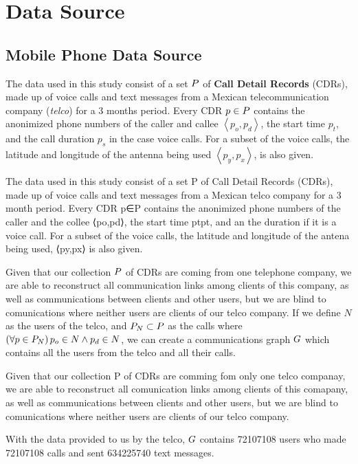 \section{Data Source}

\subsection{Mobile Phone Data Source}

The data used in this study consist of a set \( \mathlarger{P} \) of \textbf{Call Detail Records} (CDRs), made up of voice calls and text messages from a Mexican telecommunication company (\textit{telco}) for a 3 months period.
Every CDR \( p \in \mathlarger{P} \)  contains the anonimized phone numbers of the caller and callee \( \left< p_o, p_d \right> \), the start time \( p_t \), and the call duration \( p_s \) in the case voice calls. 
For a subset of the voice calls, the latitude and longitude of the antenna being used \( \left< p_y, p_x \right> \), is also given.

The data used in this study consist of a set P of Call Detail Records (CDRs), made up of voice calls and text messages from a Mexican telco company for a 3 month period. Every CDR p∈P contains the anonimized phone numbers of the caller and the collee ⟨po,pd⟩, the start time ptpt, and an the duration if it is a voice call. For a subset of the voice calls, the latitude and longitude of the antena being used, ⟨py,px⟩ is also given.


Given that our collection \( \mathlarger{P} \) of CDRs are
coming from one telephone company, 
we are able to reconstruct all communication links among clients of this company, as well as communications between clients and other users, but we are blind to comunications where neither users are clients of our telco company.
If we define \( N \) as the users of the telco, and \( \mathlarger{P}_N \subset \mathlarger{P} \) as the calls where \( \left( \forall p \in \mathlarger{P}_N \right) p_o \in N \wedge p_d \in N \), we can create a communications graph \( \mathlarger{G} \) which contains all the users from the telco and all their calls.

Given that our collection P of CDRs are comming fom only one telco companay, we are able to reconstruct all comunication links among clients of this comapany, as well as communications between clients and other users, but we are blind to comunications where neither users are clients of our telco company.

With the data provided to us by the telco, \( \mathlarger{G} \) contains \num{72107108} users who made \num{72107108} calls and sent \num{634225740} text messages.
